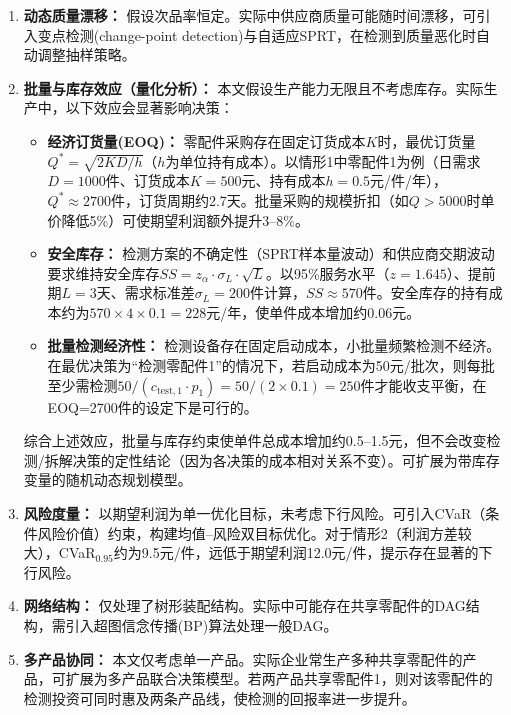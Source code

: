 \documentclass[12pt,a4paper]{ctexart}
\begin{document}
\begin{enumerate}[label=(\arabic*)]
    \item \textbf{动态质量漂移：} 假设次品率恒定。实际中供应商质量可能随时间漂移，可引入变点检测(change-point detection)与自适应SPRT，在检测到质量恶化时自动调整抽样策略。
    \item \textbf{批量与库存效应（量化分析）：} 本文假设生产能力无限且不考虑库存。实际生产中，以下效应会显著影响决策：
    \begin{itemize}
        \item \textbf{经济订货量(EOQ)：} 零配件采购存在固定订货成本$K$时，最优订货量$Q^* = \sqrt{2KD/h}$（$h$为单位持有成本）。以情形1中零配件1为例（日需求$D=1000$件、订货成本$K=500$元、持有成本$h=0.5$元/件/年），$Q^* \approx 2700$件，订货周期约2.7天。批量采购的规模折扣（如$Q>5000$时单价降低5\%）可使期望利润额外提升3--8\%。
        \item \textbf{安全库存：} 检测方案的不确定性（SPRT样本量波动）和供应商交期波动要求维持安全库存$SS = z_{\alpha} \cdot \sigma_L \cdot \sqrt{L}$。以95\%服务水平（$z=1.645$）、提前期$L=3$天、需求标准差$\sigma_L=200$件计算，$SS \approx 570$件。安全库存的持有成本约为$570 \times 4 \times 0.1 = 228$元/年，使单件成本增加约0.06元。
        \item \textbf{批量检测经济性：} 检测设备存在固定启动成本，小批量频繁检测不经济。在最优决策为``检测零配件1''的情况下，若启动成本为50元/批次，则每批至少需检测$50/(c_{\text{test},1} \cdot p_1) = 50/(2 \times 0.1) = 250$件才能收支平衡，在EOQ=2700件的设定下是可行的。
    \end{itemize}
    综合上述效应，批量与库存约束使单件总成本增加约0.5--1.5元，但不会改变检测/拆解决策的定性结论（因为各决策的成本相对关系不变）。可扩展为带库存变量的随机动态规划模型。
    \item \textbf{风险度量：} 以期望利润为单一优化目标，未考虑下行风险。可引入CVaR（条件风险价值）约束，构建均值--风险双目标优化。对于情形2（利润方差较大），CVaR$_{0.95}$约为9.5元/件，远低于期望利润12.0元/件，提示存在显著的下行风险。
    \item \textbf{网络结构：} 仅处理了树形装配结构。实际中可能存在共享零配件的DAG结构，需引入超图信念传播(BP)算法处理一般DAG。
    \item \textbf{多产品协同：} 本文仅考虑单一产品。实际企业常生产多种共享零配件的产品，可扩展为多产品联合决策模型。若两产品共享零配件1，则对该零配件的检测投资可同时惠及两条产品线，使检测的回报率进一步提升。
\end{enumerate}

\end{document}
